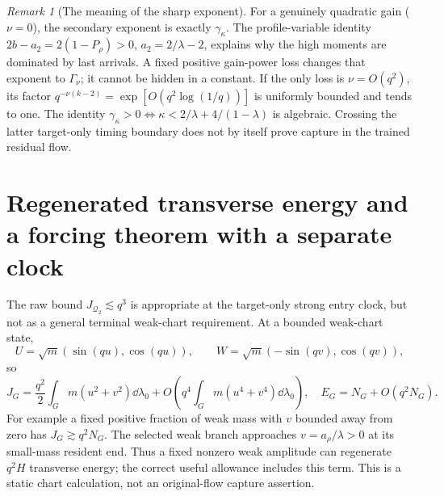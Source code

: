 \documentclass[11pt]{article}
\theoremstyle{remark}\newtheorem{remark}[theorem]{Remark}
\newcommand{\Qtwo}{\mathcal Q_2}\newcommand{\Clk}{\mathcal C_q}
\begin{document}
\begin{remark}[The meaning of the sharp exponent]
For a genuinely quadratic gain ($\nu=0$), the secondary exponent is exactly $\gamma_\kappa$. The profile-variable identity $2b-a_2=2(1-P_\rho)>0$, $a_2=2/\lambda-2$, explains why the high moments are dominated by last arrivals. A fixed positive gain-power loss changes that exponent to $\Gamma_\nu$; it cannot be hidden in a constant. If the only loss is $\nu=O(q^2)$, its factor $q^{-\nu(k-2)}=\exp[O(q^2\log(1/q))]$ is uniformly bounded and tends to one. The identity $\gamma_\kappa>0\iff\kappa<2/\lambda+4/(1-\lambda)$ is algebraic. Crossing the latter target-only timing boundary does not by itself prove capture in the trained residual flow.
\end{remark}

\section{Regenerated transverse energy and a forcing theorem with a separate clock}
The raw bound $J_{\Qtwo}\lesssim q^3$ is appropriate at the target-only strong entry clock, but not as a general terminal weak-chart requirement. At a bounded weak-chart state,
\[
 U=\sqrt m(\sin(qu),\cos(qu)),\qquad
 W=\sqrt m(-\sin(qv),\cos(qv)),
\]
so
\begin{equation}\label{inc:AN03:bulkclock:v1:weakJ}
 J_G=\frac{q^2}{2}\int_Gm(u^2+v^2)\dd\lambda_0
       +O\left(q^4\int_Gm(u^4+v^4)\dd\lambda_0\right),\quad
 E_G=N_G+O(q^2N_G).
\end{equation}
For example a fixed positive fraction of weak mass with $v$ bounded away from zero has $J_G\gtrsim q^2N_G$. The selected weak branch approaches $v=a_\rho/\lambda>0$ at its small-mass resident end. Thus a fixed nonzero weak amplitude can regenerate $q^2H$ transverse energy; the correct useful allowance includes this term. This is a static chart calculation, not an original-flow capture assertion.
\end{document}
